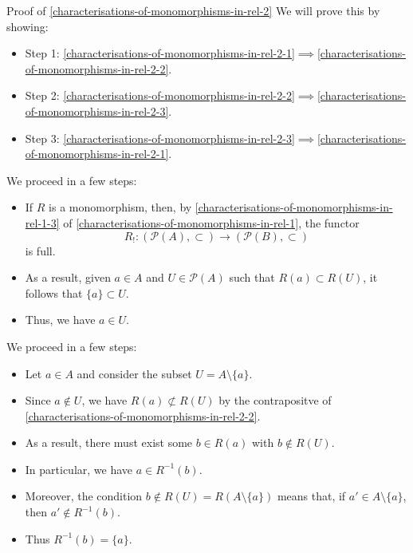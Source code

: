 \begin{Proof}{Proof of \cref{characterisations-of-monomorphisms-in-rel-2}}%
    We will prove this by showing:
    \begin{itemize}
        \item Step 1: \cref{characterisations-of-monomorphisms-in-rel-2-1}$\implies$\cref{characterisations-of-monomorphisms-in-rel-2-2}.
        \item Step 2: \cref{characterisations-of-monomorphisms-in-rel-2-2}$\implies$\cref{characterisations-of-monomorphisms-in-rel-2-3}.
        \item Step 3: \cref{characterisations-of-monomorphisms-in-rel-2-3}$\implies$\cref{characterisations-of-monomorphisms-in-rel-2-1}.
    \end{itemize}

    We proceed in a few steps:
    \begin{itemize}
        \item If $R$ is a monomorphism, then, by \cref{characterisations-of-monomorphisms-in-rel-1-3} of \cref{characterisations-of-monomorphisms-in-rel-1}, the functor
            \[
                R_{!}%
                \colon%
                (\mathcal{P}(A),\subset)%
                \to%
                (\mathcal{P}(B),\subset)%
            \]%
            is full.
        \item As a result, given $a\in A$ and $U\in\mathcal{P}(A)$ such that $R(a)\subset R(U)$, it follows that $\{a\}\subset U$.
        \item Thus, we have $a\in U$.
    \end{itemize}

    We proceed in a few steps:
    \begin{itemize}
        \item Let $a\in A$ and consider the subset $U=A\setminus\{a\}$.
        \item Since $a\nin U$, we have $R(a)\nsubset R(U)$ by the contrapositve of \cref{characterisations-of-monomorphisms-in-rel-2-2}.
        \item As a result, there must exist some $b\in R(a)$ with $b\nin R(U)$.
        \item In particular, we have $a\in R^{-1}(b)$.
        \item Moreover, the condition $b\nin R(U)=R(A\setminus\{a\})$ means that, if $a'\in A\setminus\{a\}$, then $a'\nin R^{-1}(b)$.
        \item Thus $R^{-1}(b)=\{a\}$.
    \end{itemize}


\end{Proof}
